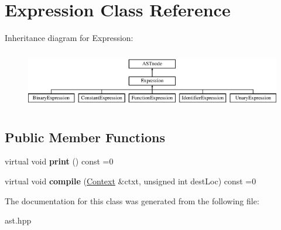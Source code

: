 \hypertarget{class_expression}{}\section{Expression Class Reference}
\label{class_expression}
Inheritance diagram for Expression\+:\begin{figure}[H]
\begin{center}
\leavevmode
\includegraphics[height=2.564885cm]{class_expression}
\end{center}
\end{figure}
\subsection*{Public Member Functions}
\begin{DoxyCompactItemize}
\item 
\mbox{\label{class_expression_ae11e78376212134745e5fa9f0b91dbd1}} 
virtual void {\bfseries print} () const =0
\item 
\mbox{\label{class_expression_af8973027899fe2dcd3fb91cfc52e7eb6}} 
virtual void {\bfseries compile} (\hyperlink{class_context}{Context} \&ctxt, unsigned int dest\+Loc) const =0
\end{DoxyCompactItemize}


The documentation for this class was generated from the following file\+:\begin{DoxyCompactItemize}
\item 
ast.\+hpp\end{DoxyCompactItemize}
